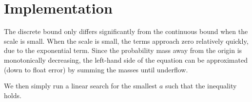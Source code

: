 \documentclass{article}
\begin{document}
\section{Implementation}

The discrete bound only differs significantly from the continuous bound when the scale is small.
When the scale is small, the terms approach zero relatively quickly, due to the exponential term.
Since the probability mass away from the origin is monotonically decreasing,
the left-hand side of the equation can be approximated (down to float error) by summing the masses until underflow.

We then simply run a linear search for the smallest $a$ such that the inequality holds.
\end{document}
